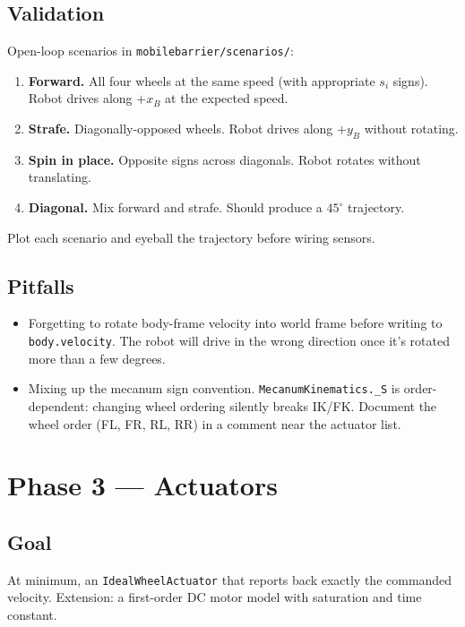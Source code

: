 \documentclass[11pt,a4paper]{article}
\newcommand{\code}[1]{\texttt{\small #1}}
\newcommand{\file}[1]{\texttt{\small #1}}
\begin{document}
\subsection*{Validation}

Open-loop scenarios in \file{mobilebarrier/scenarios/}:
\begin{enumerate}
    \item \textbf{Forward.} All four wheels at the same speed (with
        appropriate $s_i$ signs). Robot drives along $+x_B$ at the expected
        speed.
    \item \textbf{Strafe.} Diagonally-opposed wheels. Robot drives along
        $+y_B$ without rotating.
    \item \textbf{Spin in place.} Opposite signs across diagonals. Robot
        rotates without translating.
    \item \textbf{Diagonal.} Mix forward and strafe. Should produce a
        $45^{\circ}$ trajectory.
\end{enumerate}
Plot each scenario and eyeball the trajectory before wiring sensors.

\subsection*{Pitfalls}

\begin{itemize}
    \item Forgetting to rotate body-frame velocity into world frame before
        writing to \code{body.velocity}. The robot will drive in the wrong
        direction once it's rotated more than a few degrees.
    \item Mixing up the mecanum sign convention. \code{MecanumKinematics.\_S}
        is order-dependent: changing wheel ordering silently breaks IK/FK.
        Document the wheel order (FL, FR, RL, RR) in a comment near the
        actuator list.
\end{itemize}

\section{Phase 3 --- Actuators}
\label{sec:actuators}

\subsection*{Goal}
At minimum, an \code{IdealWheelActuator} that reports back exactly the
commanded velocity. Extension: a first-order DC motor model with
saturation and time constant.
\end{document}
